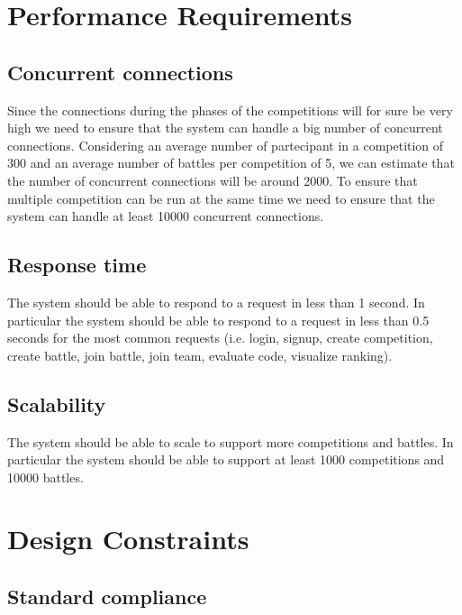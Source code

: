 \section{Performance Requirements}
\label{s:Performance_requirements}%

\subsection*{Concurrent connections}
\label{ss:Concurrent_connections}%

Since the connections during the phases of the competitions will for sure be very high we need to ensure that the system can handle a big number of concurrent connections. Considering an average number of partecipant in a competition of 300 and an average number of battles per competition of 5, we can estimate that the number of concurrent connections will be around 2000. To ensure that multiple competition can be run at the same time we need to ensure that the system can handle at least 10000 concurrent connections.

\subsection*{Response time}
\label{ss:Response_time}%

The system should be able to respond to a request in less than 1 second. In particular the system should be able to respond to a request in less than 0.5 seconds for the most common requests (i.e. login, signup, create competition, create battle, join battle, join team, evaluate code, visualize ranking).

\subsection*{Scalability}
\label{ss:Scalability}%

The system should be able to scale to support more competitions and battles. In particular the system should be able to support at least 1000 competitions and 10000 battles.



\section{Design Constraints}
\label{s:Design_constraints}%

\subsection{Standard compliance}
\label{ss:Standard_compliance}%

